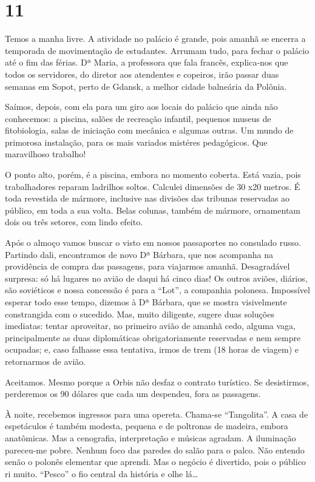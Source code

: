 \section*{11 \adfflatleafright {}}
Temos a manha livre. A atividade no palácio é grande, pois amanhã se encerra a temporada de movimentação de estudantes. Arrumam tudo, para fechar o palácio até o fim das férias. Dª Maria, a professora que fala francês, explica-nos que todos os servidores, do diretor aos atendentes e copeiros, irão passar duas semanas em Sopot, perto de Gdansk, a melhor cidade balneária da Polônia.

Saímos, depois, com ela para um giro aos locais do palácio que ainda não conhecemos: a piscina, salões de recreação infantil, pequenos museus de fitobiologia, salas de iniciação com mecânica e algumas outras. Um mundo de primorosa instalação, para os mais variados mistéres pedagógicos. Que maravilhoso trabalho!

O ponto alto, porém, é a piscina, embora no momento coberta. Está vazia, pois trabalhadores reparam ladrilhos soltos. Calculei dimensões de 30 x20 metros. É toda revestida de mármore, inclusive nas divisões das tribunas reservadas ao público, em toda a sua volta. Belas colunas, também de mármore, ornamentam dois ou três setores, com lindo efeito.

Após o almoço vamos buscar o visto em nossos passaportes no consulado russo. Partindo dali, encontramos de novo Dª Bárbara, que nos acompanha na providência de compra das passagens, para viajarmos amanhã. Desagradável surpresa: só há lugares no avião de daqui há cinco dias! Os outros aviões, diários, são soviéticos e nossa concessão é para a “Lot”, a companhia polonesa. Impossível esperar todo esse tempo, dizemos à Dª Bárbara, que se mostra visivelmente constrangida com o sucedido. Mas, muito diligente, sugere duas soluções imediatas: tentar aproveitar, no primeiro avião de amanhã cedo, alguma vaga, principalmente as duas diplomáticas obrigatoriamente reservadas e nem sempre ocupadas; e, caso falhasse essa tentativa, irmos de trem (18 horas de viagem) e retornarmos de avião.

Aceitamos. Mesmo porque a Orbis não desfaz o contrato turístico. Se desistirmos, perderemos os 90 dólares que cada um despendeu, fora as passagens.

À noite, recebemos ingressos para uma opereta. Chama-se “Tangolita”. A casa de espetáculos é também modesta, pequena e de poltronas de madeira, embora anatômicas. Mas a cenografia, interpretação e músicas agradam. A iluminação pareceu-me pobre. Nenhum foco das paredes do salão para o palco. Não entendo senão o polonês elementar que aprendi. Mas o negócio é divertido, pois o público ri muito. “Pesco” o fio central da história e olhe lá\ldots

